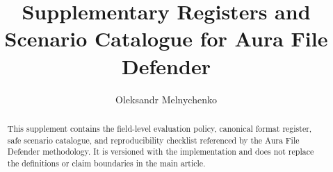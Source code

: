 \documentclass[preprint,12pt,a4paper]{elsarticle}
\begin{document}
\begin{frontmatter}
\title{Supplementary Registers and Scenario Catalogue for Aura File Defender}
\author{Oleksandr Melnychenko}
\address{Khmelnytskyi National University, Khmelnytskyi, Ukraine}

\begin{abstract}
This supplement contains the field-level evaluation policy, canonical format
register, safe scenario catalogue, and reproducibility checklist referenced by
the Aura File Defender methodology. It is versioned with the implementation and
does not replace the definitions or claim boundaries in the main article.
\end{abstract}
\end{frontmatter}

\appendix




\end{document}
